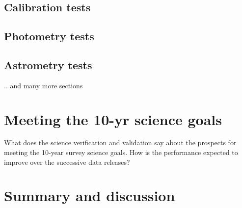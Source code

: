 \subsection{Calibration tests }

\subsection{Photometry tests }

\subsection{Astrometry tests }

 .. and many more sections


 \section{Meeting the 10-yr science goals} 
 What does the science verification and validation say about the prospects for meeting the 10-year survey science goals. How is the performance expected to improve over the successive data releases? 
 \section{Summary and discussion} 